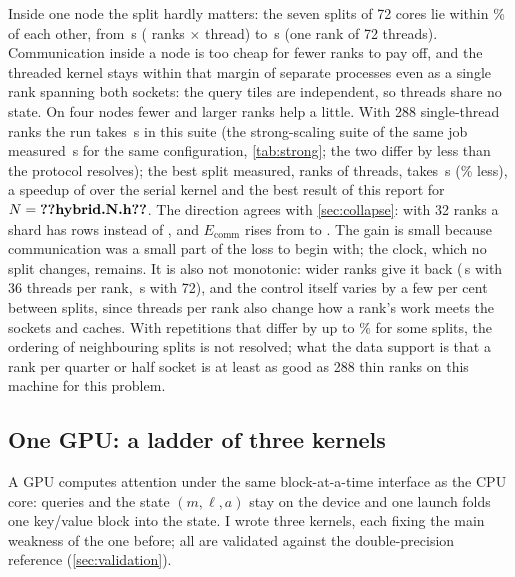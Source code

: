 Inside one node the split hardly matters: the seven splits of 72 cores lie within
\% of each other, from \,s
( ranks $\times$  thread) to
\,s (one rank of 72 threads). Communication inside a node is
too cheap for fewer ranks to pay off, and the threaded kernel stays within that
margin of separate processes even as a single rank spanning both sockets: the
query tiles are independent, so threads share no state.
On four nodes fewer and larger ranks help a little. With 288 single-thread ranks
the run takes \,s in this suite (the strong-scaling suite
of the same job measured \,s for the same configuration,
\cref{tab:strong}; the two differ by less than the protocol resolves); the best
split measured,
 ranks of  threads, takes
\,s (\% less), a speedup of
 over the serial kernel and the best result of this report
for $N=\n{hybrid.N.h}$. The direction agrees with \cref{sec:collapse}: with 32 ranks
a shard has  rows instead of , and
$E_\text{comm}$ rises from  to . The
gain is small because communication was a small part of the loss to begin with;
the clock, which no split changes, remains. It is also not monotonic: wider ranks
give it back (\,s with 36 threads per rank,
\,s with 72), and the control itself varies by a few per cent
between splits, since threads per rank also change how a rank's work meets the
sockets and caches. With repetitions that differ by up to
\% for some splits, the ordering of neighbouring splits
is not resolved; what the data support is that a rank per quarter or half socket
is at least as good as 288 thin ranks on this machine for this problem.

\subsection{One GPU: a ladder of three kernels}\label{sec:gpu}
A GPU computes attention under the same block-at-a-time interface as the CPU core:
queries and the state $(m,\ell,a)$ stay on the device and one launch folds one
key/value block into the state. I wrote three kernels, each fixing the main weakness
of the one before; all are validated against the double-precision reference
(\cref{sec:validation}).

